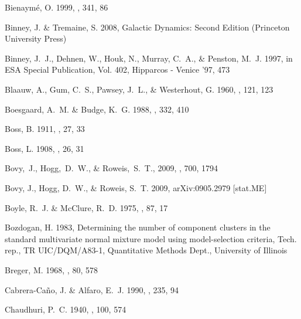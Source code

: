 \begin{thebibliography}{99}
{Bienaym{\'e}}, O. 1999, \aap, 341, 86

{Binney}, J. \& {Tremaine}, S. 2008, {Galactic Dynamics: Second Edition}
  (Princeton University Press)

{Binney}, J.~J., {Dehnen}, W., {Houk}, N., {Murray}, C.~A., \& {Penston}, M.~J.
  1997, in ESA Special Publication, Vol. 402, Hipparcos - Venice '97, 473

{Blaauw}, A., {Gum}, C.~S., {Pawsey}, J.~L., \& {Westerhout}, G. 1960, \mnras,
  121, 123

{Boesgaard}, A.~M. \& {Budge}, K.~G. 1988, \apj, 332, 410

{Boss}, B. 1911, \aj, 27, 33

{Boss}, L. 1908, \aj, 26, 31

  Bovy,~J., Hogg,~D.~W., \& Roweis,~S.~T., 2009,
  \apj, 700, 1794

{Bovy}, J., {Hogg}, D.~W., \& {Roweis}, S.~T. 2009, {arXiv:0905.2979 [stat.ME]}

{Boyle}, R.~J. \& {McClure}, R.~D. 1975, \pasp, 87, 17

{Bozdogan}, H. 1983, {Determining the number of component clusters in the
  standard multivariate normal mixture model using model-selection criteria},
  Tech. rep., {TR UIC/DQM/A83-1, Quantitative Methods Dept., University of
  Illinois}

{Breger}, M. 1968, \pasp, 80, 578

{Cabrera-Ca\~{n}o}, J. \& {Alfaro}, E.~J. 1990, \aap, 235, 94

{Chaudhuri}, P.~C. 1940, \mnras, 100, 574


\end{thebibliography}
